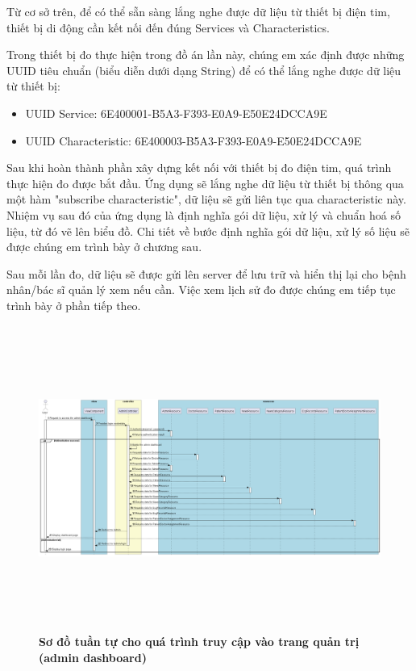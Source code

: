 Từ cơ sở trên, để có thể sẵn sàng lắng nghe được dữ liệu từ thiết bị điện tim, thiết bị di động cần kết nối đến đúng Services và Characteristics.

Trong thiết bị đo thực hiện trong đồ án lần này, chúng em xác định được những UUID tiêu chuẩn (biểu diễn dưới dạng String) để có thể lắng nghe được dữ liệu từ
thiết bị:
\begin{itemize}
  \item UUID Service: 6E400001-B5A3-F393-E0A9-E50E24DCCA9E
  \item UUID Characteristic: 6E400003-B5A3-F393-E0A9-E50E24DCCA9E
\end{itemize}

Sau khi hoàn thành phần xây dựng kết nối với thiết bị đo điện tim, quá trình thực hiện đo được bắt đầu. Ứng dụng sẽ lắng nghe
dữ liệu từ thiết bị thông qua một hàm "subscribe characteristic", dữ liệu sẽ gửi liên tục qua characteristic này. Nhiệm vụ sau đó của ứng dụng là
định nghĩa gói dữ liệu, xử lý và chuẩn hoá số liệu, từ đó vẽ lên biểu đồ. Chi tiết về bước định nghĩa gói dữ liệu, xử lý số liệu sẽ được chúng em trình bày
ở chương sau. 


Sau mỗi lần đo, dữ liệu sẽ được gửi lên server để lưu trữ và hiển thị lại cho bệnh nhân/bác sĩ quản lý xem nếu cần. Việc xem
lịch sử đo được chúng em tiếp tục trình bày ở phần tiếp theo.

\begin{figure}[H]
  \centering
  \includegraphics[width=16cm,height=10cm]{Images/server/sequence/web/seq_auth.png}
  \caption[Sơ đồ tuần tự cho quá trình truy cập vào trang quản trị (admin dashboard) ]{\bfseries \fontsize{12pt}{0pt}
  \selectfont Sơ đồ tuần tự cho quá trình truy cập vào trang quản trị (admin dashboard) }
  \label{seq_auth} %
\end{figure}


